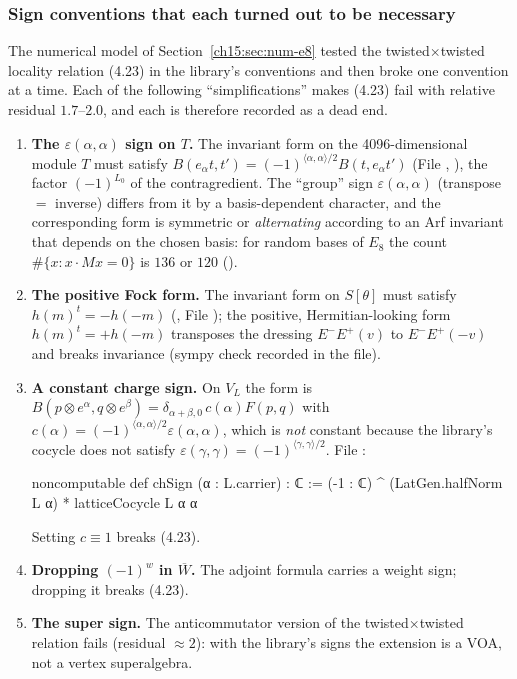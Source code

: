 \subsubsection{Sign conventions that each turned out to be necessary}

The numerical model of Section~\ref{ch15:sec:num-e8} tested the twisted$\times$twisted locality
relation (4.23) in the library's conventions and then broke one convention at a time. Each of the
following ``simplifications'' makes (4.23) fail with relative residual $1.7$--$2.0$, and each is
therefore recorded as a dead end.
\begin{enumerate}
\item \textbf{The $\varepsilon(\alpha,\alpha)$ sign on $T$.} The invariant form on the 4096-dimensional
  module $T$ must satisfy $B(e_\alpha t,t')=(-1)^{\langle\alpha,\alpha\rangle/2}B(t,e_\alpha t')$
  (File , ), the factor $(-1)^{L_0}$ of the
  contragredient. The ``group'' sign $\varepsilon(\alpha,\alpha)$ (transpose $=$ inverse) differs from
  it by a basis-dependent character, and the corresponding form is symmetric or \emph{alternating}
  according to an Arf invariant that depends on the chosen basis: for random bases of $E_8$ the
  count $\#\{x:x\cdot Mx=0\}$ is $136$ or $120$
  ().
\item \textbf{The positive Fock form.} The invariant form on $S[\theta]$ must satisfy
  $h(m)^{t}=-h(-m)$ (, File ); the positive,
  Hermitian-looking form $h(m)^t=+h(-m)$ transposes the dressing $E^-E^+(v)$ to $E^-E^+(-v)$ and
  breaks invariance (sympy check recorded in the file).
\item \textbf{A constant charge sign.} On $V_L$ the form is
  $B(p\otimes e^\alpha,q\otimes e^\beta)=\delta_{\alpha+\beta,0}\,c(\alpha)F(p,q)$ with
  $c(\alpha)=(-1)^{\langle\alpha,\alpha\rangle/2}\varepsilon(\alpha,\alpha)$, which is \emph{not} constant
  because the library's cocycle does not satisfy $\varepsilon(\gamma,\gamma)=(-1)^{\langle\gamma,\gamma\rangle/2}$.
  File :
\begin{leancode}
noncomputable def chSign (α : L.carrier) : ℂ :=
  (-1 : ℂ) ^ (LatGen.halfNorm L α) * latticeCocycle L α α
\end{leancode}
  Setting $c\equiv1$ breaks (4.23).
\item \textbf{Dropping $(-1)^w$ in $\overline W$.} The adjoint formula carries a weight sign; dropping it
  breaks (4.23).
\item \textbf{The super sign.} The anticommutator version of the twisted$\times$twisted relation
  fails (residual $\approx2$): with the library's signs the extension is a VOA, not a vertex
  superalgebra.
\end{enumerate}

